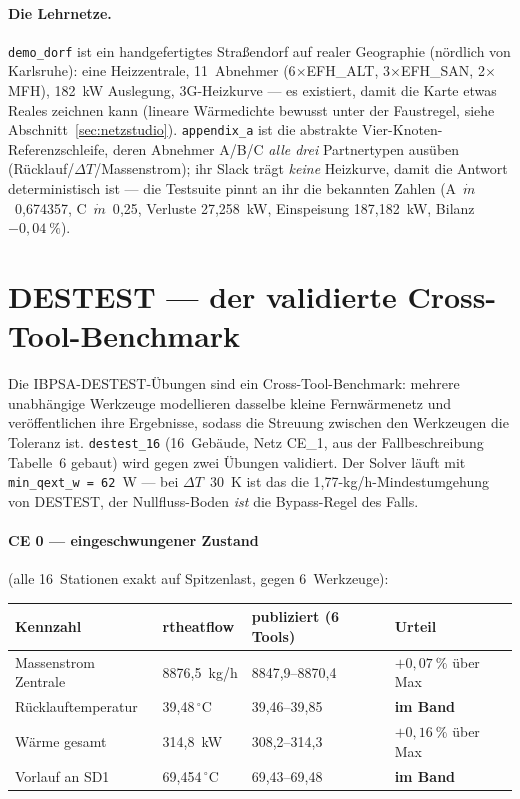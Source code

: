 \documentclass[11pt,a4paper,parskip=half]{scrreprt}
\newcommand{\gC}{\,\ensuremath{{}^{\circ}\mathrm{C}}}
\begin{document}
\paragraph{Die Lehrnetze.} \texttt{demo\_dorf} ist ein handgefertigtes Straßendorf
auf realer Geographie (nördlich von Karlsruhe): eine \glqq Heizzentrale\grqq,
11~Abnehmer (6$\times$EFH\_ALT, 3$\times$EFH\_SAN, 2$\times$MFH), 182~kW
Auslegung, 3G-Heizkurve --- es existiert, damit die Karte etwas Reales zeichnen
kann (lineare Wärmedichte bewusst unter der Faustregel, siehe
Abschnitt~\ref{sec:netzstudio}). \texttt{appendix\_a} ist die abstrakte
Vier-Knoten-Referenzschleife, deren Abnehmer A/B/C \emph{alle drei}
Partnertypen ausüben (Rücklauf/$\Delta T$/Massenstrom); ihr Slack trägt
\emph{keine} Heizkurve, damit die Antwort deterministisch ist --- die Testsuite
pinnt an ihr die bekannten Zahlen (A~$\dot m$~0{,}674357, C~$\dot m$~0{,}25,
Verluste 27{,}258~kW, Einspeisung 187{,}182~kW, Bilanz $-0{,}04~\%$).

\section{DESTEST --- der validierte Cross-Tool-Benchmark}

Die IBPSA-\glqq DESTEST\grqq-Übungen sind ein Cross-Tool-Benchmark: mehrere
unabhängige Werkzeuge modellieren dasselbe kleine Fernwärmenetz und
veröffentlichen ihre Ergebnisse, sodass die Streuung zwischen den Werkzeugen die
Toleranz ist. \texttt{destest\_16} (16~Gebäude, Netz CE\_1, aus der
Fallbeschreibung Tabelle~6 gebaut) wird gegen zwei Übungen validiert. Der
Solver läuft mit \texttt{min\_qext\_w~=~62}~W --- bei $\Delta T$~30~K ist das die
1{,}77-kg/h-Mindestumgehung von DESTEST, der Nullfluss-Boden \emph{ist} die
Bypass-Regel des Falls.

\paragraph{CE 0 --- eingeschwungener Zustand} (alle 16~Stationen exakt auf
Spitzenlast, gegen 6~Werkzeuge):

{\small
\begin{center}
\begin{tabular}{@{}llll@{}}
\toprule
Kennzahl & rtheatflow & publiziert (6 Tools) & Urteil \\
\midrule
Massenstrom Zentrale & 8876{,}5~kg/h & 8847{,}9--8870{,}4 & $+0{,}07~\%$ über Max \\
Rücklauftemperatur   & 39{,}48\gC    & 39{,}46--39{,}85   & \textbf{im Band} \\
Wärme gesamt         & 314{,}8~kW    & 308{,}2--314{,}3   & $+0{,}16~\%$ über Max \\
Vorlauf an SD1       & 69{,}454\gC   & 69{,}43--69{,}48   & \textbf{im Band} \\
\bottomrule
\end{tabular}
\end{center}}
\end{document}
